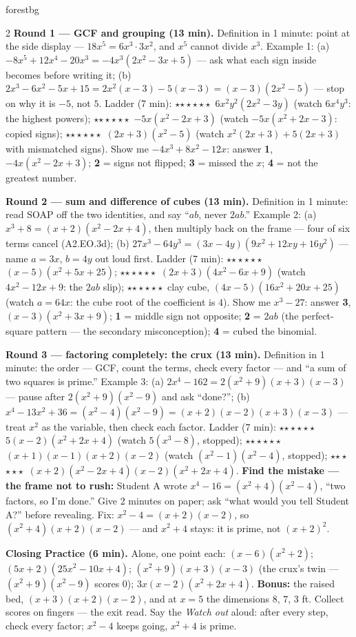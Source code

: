 \documentclass[10pt]{article}
\newcommand{\rung}[1]{{\color{goldacc}\ifcase#1\or$\star$\or$\star\star$\or$\star\star\star$\fi}}
\begin{document}
\begin{skillbox}{forestbg}
\begin{multicols}{2}
\textbf{Round 1 --- GCF and grouping (13 min).} Definition in 1 minute: point at the side
display --- $18x^5=6x^3\cdot3x^2$, and $x^5$ cannot divide $x^3$. Example 1: (a)
$-8x^5+12x^4-20x^3=-4x^3(2x^2-3x+5)$ --- ask what each sign inside becomes before writing it;
(b) $2x^3-6x^2-5x+15=2x^2(x-3)-5(x-3)=(x-3)(2x^2-5)$ --- stop on why it is $-5$, not $5$.
Ladder (7 min): \rung1\ $6x^2y^2(2x^2-3y)$ (watch $6x^4y^3$: the highest powers);
\rung2\ $-5x(x^2-2x+3)$ (watch $-5x(x^2+2x-3)$: copied signs); \rung3\
$(2x+3)(x^2-5)$ (watch $x^2(2x+3)+5(2x+3)$ with mismatched signs). Show me $-4x^3+8x^2-12x$:
answer \textbf{1}, $-4x(x^2-2x+3)$; \textbf{2} = signs not flipped; \textbf{3} = missed the
$x$; \textbf{4} = not the greatest number.

\textbf{Round 2 --- sum and difference of cubes (13 min).} Definition in 1 minute: read SOAP
off the two identities, and say ``$ab$, never $2ab$.'' Example 2: (a) $x^3+8=(x+2)(x^2-2x+4)$,
then multiply back on the frame --- four of six terms cancel (A2.EO.3d); (b)
$27x^3-64y^3=(3x-4y)(9x^2+12xy+16y^2)$ --- name $a=3x$, $b=4y$ out loud first. Ladder (7 min):
\rung1\ $(x-5)(x^2+5x+25)$; \rung2\ $(2x+3)(4x^2-6x+9)$ (watch $4x^2-12x+9$: the $2ab$ slip);
\rung3\ clay cube, $(4x-5)(16x^2+20x+25)$ (watch $a=64x$: the cube root of the coefficient is
$4$). Show me $x^3-27$: answer \textbf{3}, $(x-3)(x^2+3x+9)$; \textbf{1} = middle sign not
opposite; \textbf{2} = $2ab$ (the perfect-square pattern --- the secondary misconception);
\textbf{4} = cubed the binomial.

\columnbreak
\textbf{Round 3 --- factoring completely: the crux (13 min).} Definition in 1 minute: the
order --- GCF, count the terms, check every factor --- and ``a sum of two squares is prime.''
Example 3: (a) $2x^4-162=2(x^2+9)(x+3)(x-3)$ --- pause after $2(x^2+9)(x^2-9)$ and ask ``done?'';
(b) $x^4-13x^2+36=(x^2-4)(x^2-9)=(x+2)(x-2)(x+3)(x-3)$ --- treat $x^2$ as the variable, then
check each factor. Ladder (7 min): \rung1\ $5(x-2)(x^2+2x+4)$ (watch $5(x^3-8)$, stopped);
\rung2\ $(x+1)(x-1)(x+2)(x-2)$ (watch $(x^2-1)(x^2-4)$, stopped); \rung3\
$(x+2)(x^2-2x+4)(x-2)(x^2+2x+4)$. \textbf{Find the mistake --- the frame not to rush:} Student
A wrote $x^4-16=(x^2+4)(x^2-4)$, ``two factors, so I'm done.'' Give 2 minutes on paper; ask
``what would you tell Student A?'' before revealing. Fix: $x^2-4=(x+2)(x-2)$, so
$(x^2+4)(x+2)(x-2)$ --- and $x^2+4$ stays: it is prime, not $(x+2)^2$.

\textbf{Closing Practice (6 min).} Alone, one point each: $(x-6)(x^2+2)$;
$(5x+2)(25x^2-10x+4)$; $(x^2+9)(x+3)(x-3)$ (the crux's twin --- $(x^2+9)(x^2-9)$ scores 0);
$3x(x-2)(x^2+2x+4)$. \textbf{Bonus:} the raised bed, $(x+3)(x+2)(x-2)$, and at $x=5$ the
dimensions $8$, $7$, $3$ ft. Collect scores on fingers --- the exit read. Say the \emph{Watch
out} aloud: after every step, check every factor; $x^2-4$ keeps going, $x^2+4$ is prime.
\end{multicols}
\end{skillbox}
\end{document}
